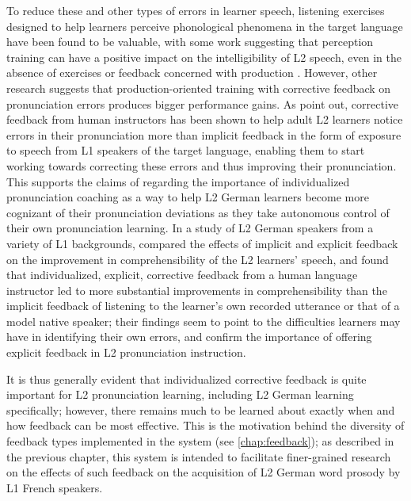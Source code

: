 To reduce these and other types of errors in learner speech,
listening exercises designed to help 
learners perceive phonological phenomena in the target language
have been found to be valuable, with some work suggesting that perception training can have a positive impact on the intelligibility of L2 speech, even in the absence of exercises or feedback concerned with production \citep{Derwing2005,Hirschfeld2007}.
%
However, 
other research suggests that production-oriented training with corrective feedback on pronunciation errors produces bigger performance gains. %
%
%
As \textcite{Neri2002} point out, corrective feedback from human instructors has been shown to help adult L2 learners notice errors in their pronunciation more than implicit feedback in the form of exposure to speech from L1 speakers of the target language, enabling them to start working towards correcting these errors and thus improving their pronunciation.
This supports the claims of \textcite{Mehlhorn2005} regarding the importance of individualized pronunciation coaching as a way to help L2 German learners become more cognizant of their pronunciation deviations as they take autonomous control of their own pronunciation learning.
%
In a study of L2 German speakers from a variety of L1 backgrounds, \textcite{Dlaska2013} compared the effects of implicit and explicit feedback on the improvement in comprehensibility of the L2 learners' speech, and found that individualized, explicit, corrective feedback from a human language instructor led to more substantial improvements in comprehensibility than the implicit feedback of listening to the learner's own recorded utterance or that of a model native speaker; their findings seem to point to the difficulties learners may have in identifying their own errors, and confirm the importance of offering explicit feedback in L2 pronunciation instruction. 
%

It is thus generally evident that individualized corrective feedback is quite important for L2 pronunciation learning, including L2 German learning specifically; however, there remains much to be learned about exactly when and how feedback can be most effective. This is the motivation behind the 
diversity of feedback types implemented in the  
system (see \cref{chap:feedback}); as described in the previous chapter, this system is intended to facilitate finer-grained research on the effects of such feedback on the acquisition of L2 German word prosody by L1 French speakers.




